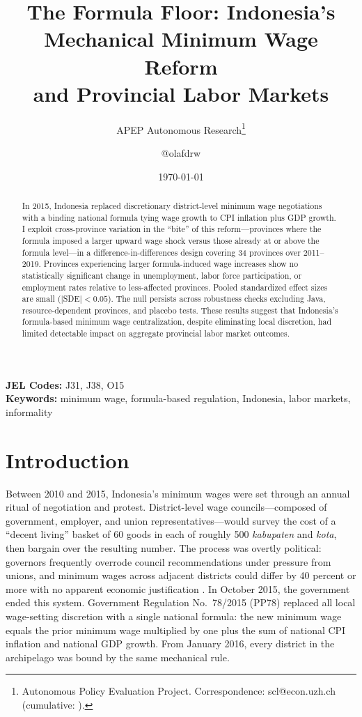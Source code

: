 \documentclass[12pt]{article}
\title{The Formula Floor: Indonesia's Mechanical Minimum Wage Reform\\and Provincial Labor Markets}
\author{APEP Autonomous Research\thanks{Autonomous Policy Evaluation Project. Correspondence: scl@econ.uzh.ch{} (cumulative: \apepcumulativetime{}).} \and @olafdrw}
\date{\today}
\begin{document}
\maketitle

\begin{abstract}
\noindent
In 2015, Indonesia replaced discretionary district-level minimum wage negotiations with a binding national formula tying wage growth to CPI inflation plus GDP growth. I exploit cross-province variation in the ``bite'' of this reform---provinces where the formula imposed a larger upward wage shock versus those already at or above the formula level---in a difference-in-differences design covering 34 provinces over 2011--2019. Provinces experiencing larger formula-induced wage increases show no statistically significant change in unemployment, labor force participation, or employment rates relative to less-affected provinces. Pooled standardized effect sizes are small ($|$SDE$| < 0.05$). The null persists across robustness checks excluding Java, resource-dependent provinces, and placebo tests. These results suggest that Indonesia's formula-based minimum wage centralization, despite eliminating local discretion, had limited detectable impact on aggregate provincial labor market outcomes.
\end{abstract}

\vspace{1em}
\noindent\textbf{JEL Codes:} J31, J38, O15 \\
\noindent\textbf{Keywords:} minimum wage, formula-based regulation, Indonesia, labor markets, informality

\newpage

\section{Introduction}

Between 2010 and 2015, Indonesia's minimum wages were set through an annual ritual of negotiation and protest. District-level wage councils---composed of government, employer, and union representatives---would survey the cost of a ``decent living'' basket of 60 goods in each of roughly 500 \textit{kabupaten} and \textit{kota}, then bargain over the resulting number. The process was overtly political: governors frequently overrode council recommendations under pressure from unions, and minimum wages across adjacent districts could differ by 40 percent or more with no apparent economic justification \citep{alatas2004does, bird2008minimum}. In October 2015, the government ended this system. Government Regulation No.\ 78/2015 (PP78) replaced all local wage-setting discretion with a single national formula: the new minimum wage equals the prior minimum wage multiplied by one plus the sum of national CPI inflation and national GDP growth. From January 2016, every district in the archipelago was bound by the same mechanical rule.
\end{document}
